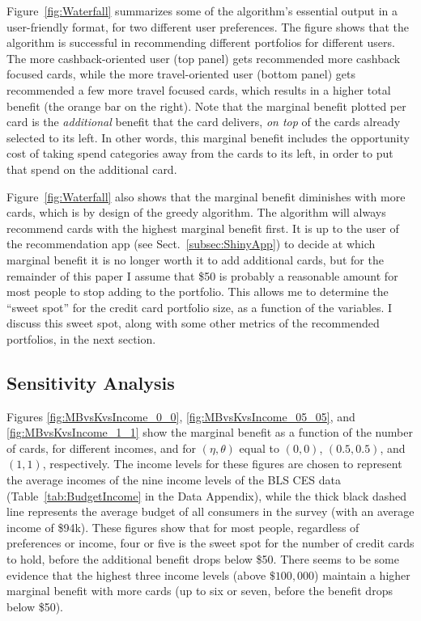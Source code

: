 Figure~\ref{fig:Waterfall} summarizes some of the algorithm's essential output in a user-friendly format, for two different user preferences. 
The figure shows that the algorithm is successful in recommending different portfolios for different users. 
The more cashback-oriented user (top panel) gets recommended more cashback focused cards, while the more travel-oriented user (bottom panel) gets recommended a few more travel focused cards, which results in a higher total benefit (the orange bar on the right).
Note that the marginal benefit plotted per card is the \emph{additional} benefit that the card delivers, \emph{on top} of the cards already selected to its left.  
In other words, this marginal benefit includes the opportunity cost of taking spend categories away from the cards to its left, in order to put that spend on the additional card. 

Figure~\ref{fig:Waterfall} also shows that the marginal benefit diminishes with more cards, which is by design of the greedy algorithm. 
The algorithm will always recommend cards with the highest marginal benefit first. 
It is up to the user of the recommendation app (see Sect.~\ref{subsec:ShinyApp}) to decide at which marginal benefit it is no longer worth it to add additional cards, but for the remainder of this paper I assume that \$50 is probably a reasonable amount for most people to stop adding to the portfolio. 
This allows me to determine the ``sweet spot'' for the credit card portfolio size, as a function of the variables. 
I discuss this sweet spot, along with some other metrics of the recommended portfolios, in the next section.

\clearpage
\subsection{Sensitivity Analysis}

Figures \ref{fig:MBvsKvsIncome_0_0}, \ref{fig:MBvsKvsIncome_05_05}, and \ref{fig:MBvsKvsIncome_1_1} show the marginal benefit as a function of the number of cards, for different incomes, and for $(\eta, \theta)$ equal to $(0,0)$, $(0.5,0.5)$, and $(1,1)$, respectively.
The income levels for these figures are chosen to represent the average incomes of the nine income levels of the BLS CES data (Table~\ref{tab:BudgetIncome} in the Data Appendix), while the thick black dashed line represents the average budget of all consumers in the survey (with an average income of \$94k).
These figures show that for most people, regardless of preferences or income, four or five is the sweet spot for the number of credit cards to hold, before the additional benefit drops below \$50.  
There seems to be some evidence that the highest three income levels (above $\$100,000$) maintain a higher marginal benefit with more cards (up to six or seven, before the benefit drops below \$50).

